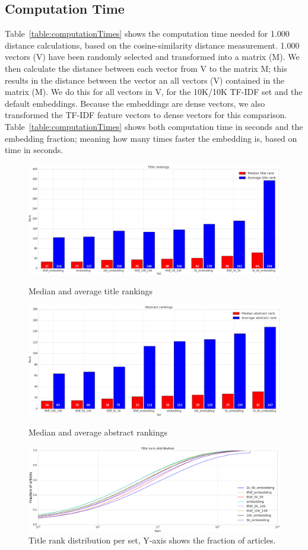 \documentclass[runningheads]{llncs}
\begin{document}
\subsection{Computation Time}
Table~\ref{table:computationTimes} shows the computation time needed for 1.000 distance calculations, based on the cosine-similarity distance measurement. 1.000 vectors (V) have been randomly selected and transformed into a matrix (M). We then calculate the distance between each vector from V to the matrix M; this results in the distance between the vector an all vectors (V) contained in the matrix (M). We do this for all vectors in V, for the 10K/10K TF-IDF set and the default embeddings. Because the embeddings are dense vectors, we also transformed the TF-IDF feature vectors to dense vectors for this comparison. Table~\ref{table:computationTimes} shows both computation time in seconds and the embedding fraction; meaning how many times faster the embedding is, based on time in seconds.
\FloatBarrier
\begin{figure}
\includegraphics[width=4.5in]{Plots/Title_rankings}
\caption{Median and average title rankings}\label{figure:titleRanks}
\includegraphics[width=4.5in]{Plots/Abstract_rankings}
\caption{Median and average abstract rankings}\label{figure:abstractRanks}
\includegraphics[width=4.5in]{Plots/Title_rank_distribution}
\caption{Title rank distribution per set, Y-axis shows the fraction of articles.}\label{figure:titleDistribution}
\end{figure}
\end{document}
